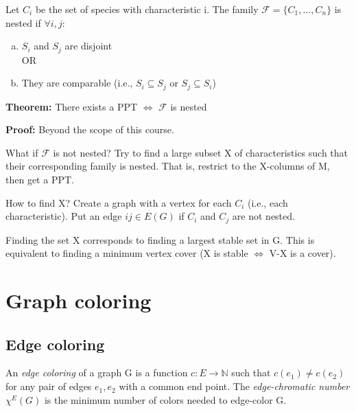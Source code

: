 \documentclass[11pt, letterpaper, oneside]{article}
\begin{document}
Let $C_i$ be the set of species with characteristic i. The family $\mathcal{F}=\{C_1, ..., C_n\}$ is nested if $\forall i, j$:
\begin{enumerate}[a)]
	\item $S_i$ and $S_j$ are disjoint \\
	OR \vspace*{-0.3cm}
	\item They are comparable (i.e., $S_i \subseteq S_j$ or $S_j \subseteq S_i$)
\end{enumerate}

\textbf{Theorem:} There exists a PPT $\Leftrightarrow$ $\mathcal{F}$ is nested

\textbf{Proof:} Beyond the scope of this course.

What if $\mathcal{F}$ is not nested? Try to find a large subset X of characteristics such that their corresponding family is nested. That is, restrict to the X-columns of M, then get a PPT. 

How to find X? Create a graph with a vertex for each $C_i$ (i.e., each characteristic). Put an edge $ij \in E(G)$ if $C_i$ and $C_j$ are not nested.

Finding the set X corresponds to finding a largest stable set in G. This is equivalent to finding a minimum vertex cover (X is stable $\Leftrightarrow$ V-X is a cover).

\section{Graph coloring}
\subsection{Edge coloring}

An \textit{edge coloring} of a graph G is a function $c: E \rightarrow \mathbb{N}$ such that $c(e_1) \ne c(e_2)$ for any pair of edges $e_1, e_2$ with a common end point. The \textit{edge-chromatic number} $\chi^E(G)$ is the minimum number of colors needed to edge-color G.
\end{document}
